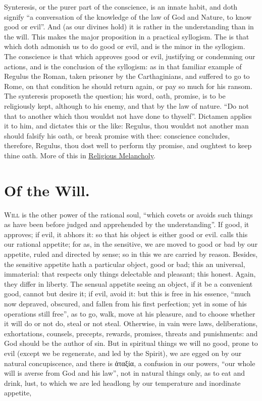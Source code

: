 Synteresis, or the purer part of the conscience, is an innate habit, and doth
signify \enquote{a conversation of the knowledge of the law of God and Nature, to know
good or evil}. And (as our divines hold) it is rather in the understanding than
in the will. This makes the major proposition in a practical syllogism. The
 is that which doth admonish us to do good or evil, and
is the minor in the syllogism. The conscience is that which approves good or
evil, justifying or condemning our actions, and is the conclusion of the
syllogism: as in that familiar example of Regulus the Roman, taken prisoner by
the Carthaginians, and suffered to go to Rome, on that condition he should
return again, or pay so much for his ransom. The synteresis proposeth the
question; his word, oath, promise, is to be religiously kept, although to his
enemy, and that by the law of nature. \enquote{Do not that to
another which thou wouldst not have done to thyself}. Dictamen applies it to
him, and dictates this or the like: Regulus, thou wouldst not another man
should falsify his oath, or break promise with thee: conscience concludes,
therefore, Regulus, thou dost well to perform thy promise, and oughtest to keep
thine oath. More of this in \hyperref[ch:religious-melancholy]{Religious
Melancholy}.

\section{Of the Will.}

\lettrine{W}{ill} is the other power of the rational soul,
\enquote{which covets or avoids such things as have been before
judged and apprehended by the understanding}. If good, it approves; if evil, it
abhors it: so that his object is either good or evil. \Aristotle{} calls this our
rational appetite; for as, in the sensitive, we are moved to good or bad by our
appetite, ruled and directed by sense; so in this we are carried by reason.
Besides, the sensitive appetite hath a particular object, good or bad; this an
universal, immaterial: that respects only things delectable and pleasant; this
honest. Again, they differ in liberty. The sensual appetite seeing an object,
if it be a convenient good, cannot but desire it; if evil, avoid it: but this
is free in his essence, \enquote{much now depraved, obscured, and
fallen from his first perfection; yet in some of his operations still free}, as
to go, walk, move at his pleasure, and to choose whether it will do or not do,
steal or not steal. Otherwise, in vain were laws, deliberations, exhortations,
counsels, precepts, rewards, promises, threats and punishments: and God should
be the author of sin. But in spiritual things we will no
good, prone to evil (except we be regenerate, and led by the Spirit), we are
egged on by our natural concupiscence, and there is \textgreek{ἀταξία}, a
confusion in our powers, \enquote{our whole will is averse from
God and his law}, not in natural things only, as to eat and drink, lust, to
which we are led headlong by our temperature and inordinate appetite,

